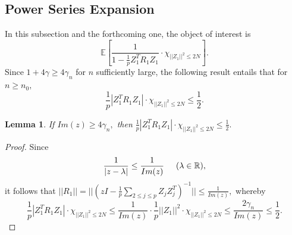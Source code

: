 \documentclass{article}
\newtheorem{lemma}{Lemma}
\numberwithin{equation}{section}
\begin{document}
\subsection{Power Series Expansion}\label{subsect2}

In this subsection and the forthcoming one, the object of interest is
\[\mathbb{E}[\frac{1}{1-\frac{1}{p}Z_1^TR_1Z_1}\cdot \chi_{||Z_1||^2 \leq 2N}].\]
Since \(1+4\gamma \geq 4 \gamma_n\) for \(n\) sufficiently large, the following result entails that for \(n \geq n_0,\) 
\begin{equation}\label{smalllen}
    \frac{1}{p}|Z_1^TR_1Z_1| \cdot \chi_{||Z_1||^2 \leq 2N} \leq \frac{1}{2}.
\end{equation}

\begin{lemma}\label{lemmasmall}
    If \(Im(z) \geq 4\gamma_n,\) then \(\frac{1}{p}|Z_1^TR_1Z_1| \cdot \chi_{||Z_1||^2 \leq 2N} \leq \frac{1}{2}.\)
\end{lemma}


\begin{proof}
    Since 
    \[\frac{1}{|z-\lambda|} \leq \frac{1}{Im(z)} \hspace{0.5cm} (\lambda \in \mathbb{R}),\]
    it follows that \(||R_1||=||(zI-\frac{1}{p}\sum_{2 \leq j \leq p}{Z_jZ_j^T})^{-1}|| \leq \frac{1}{Im(z)},\) whereby
    \[\frac{1}{p}|Z_1^TR_1Z_1|\cdot \chi_{||Z_1||^2 \leq 2N} \leq \frac{1}{Im(z)} \cdot \frac{1}{p}||Z_1||^2 \cdot  \chi_{||Z_1||^2 \leq 2N} \leq \frac{2\gamma_n}{Im(z)} \leq \frac{1}{2}.\]
\end{proof}
\end{document}
